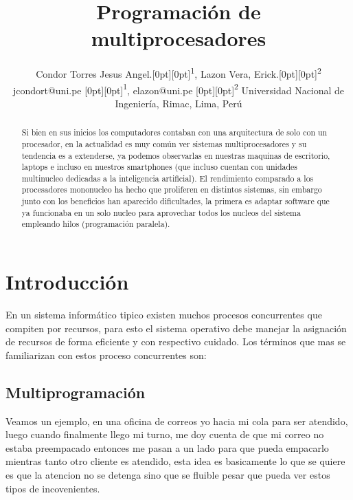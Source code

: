 \documentclass[conference,letterpaper]{IEEEtran}
\DeclareRobustCommand*{\IEEEauthorrefmark}[1]{\raisebox{0pt}[0pt][0pt]{\textsuperscript{\footnotesize #1}}}
\begin{document}
\title
{
Programación de multiprocesadores
}

\author
{
\IEEEauthorblockN
{
Condor Torres Jesus Angel.\IEEEauthorrefmark{1},
Lazon Vera, Erick.\IEEEauthorrefmark{2} 
}                                     
\IEEEauthorblockA
{
jcondort@uni.pe \IEEEauthorrefmark{1},
elazon@uni.pe \IEEEauthorrefmark{2}
}
\IEEEauthorblockA
{
Universidad Nacional de Ingeniería, Rimac, Lima, Perú}
}

\maketitle

\begin{abstract}
Si bien en sus inicios los computadores contaban con una arquitectura de solo con un procesador, en la actualidad es muy común ver sistemas multiprocesadores y su tendencia es a extenderse, ya podemos observarlas en nuestras maquinas de escritorio, laptops e incluso en nuestros smartphones (que incluso cuentan con unidades multinucleo dedicadas a la inteligencia artificial). El rendimiento comparado a los procesadores mononucleo ha hecho que proliferen en distintos sistemas, sin embargo junto con los beneficios han aparecido dificultades, la primera es adaptar software que ya funcionaba en un solo nucleo para aprovechar todos los nucleos del sistema empleando hilos (programación paralela).
\end{abstract}


\IEEEpeerreviewmaketitle

\vspace{7pt}
\section{Introducción}
En un sistema inform\'atico tipico existen muchos procesos concurrentes que compiten por recursos, para esto el sistema operativo debe manejar la asignación de recursos de forma eficiente y con respectivo cuidado. Los términos que mas se familiarizan con estos proceso concurrentes son:

\subsection{Multiprogramaci\'on}
Veamos un ejemplo, en una oficina de correos yo hacia mi cola para ser atendido, luego cuando finalmente llego mi turno, me doy cuenta de que mi correo no estaba preempacado entonces me pasan a un lado para que pueda empacarlo mientras tanto otro cliente es atendido, esta idea es basicamente lo que se quiere es que la atencion no se detenga sino que se fluible pesar que  pueda ver estos tipos de incovenientes.\\
\end{document}
